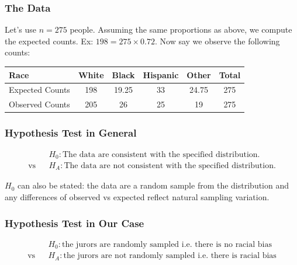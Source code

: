 \documentclass[handout]{beamer}
\newcommand{\blue}[1]{\textcolor{blue2}{#1}}
\begin{document}
\begin{frame}[fragile]
\frametitle{The Data}

Let's use $n=275$ people.  Assuming the same proportions as above,  we compute the \blue{expected} counts.  Ex: $198 = 275 \times 0.72$.  Now say we observe the following counts:

\begin{center}
\begin{tabular}{l||cccc|c}
Race & White & Black & Hispanic & Other & Total \\ 
\hline
Expected Counts & 198 & 19.25 & 33 & 24.75 & 275\\ 
Observed Counts & 205 & 26 & 25 & 19 & 275\\ 
\end{tabular}
\end{center}

\end{frame}


\begin{frame}[fragile]
\frametitle{Hypothesis Test in General}
%
%
\begin{eqnarray*}
&&H_0:\mbox{The data are consistent with the specified distribution.}\\
\mbox{vs} &&H_A:\mbox{The data are not consistent with the specified distribution.}
\end{eqnarray*}

\pause $H_0$ can also be stated: the data are a random sample from the distribution and any differences of observed vs expected reflect natural sampling variation.  
\end{frame}


\begin{frame}[fragile]
\frametitle{Hypothesis Test in Our Case}
%
%
\begin{eqnarray*}
&& H_0:\mbox{the jurors are randomly sampled i.e. there is no racial bias}\\
\mbox{vs}&& H_A:\mbox{the jurors are not randomly sampled i.e. there is racial bias}
\end{eqnarray*}
\end{frame}
\end{document}
